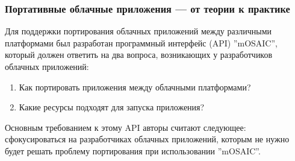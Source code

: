 \subsubsection{Портативные облачные приложения --- от теории к практике}
Для поддержки портирования облачных приложений между различными платформами был разработан программный интерфейс (API) ''mOSAIC''\cite{portable-cloud-applications}, который должен ответить на два вопроса, возникающих у разработчиков облачных приложений:
\begin{enumerate}
    \item Как портировать приложения между облачными платформами?
    \item Какие ресурсы подходят для запуска приложения?
\end{enumerate}
Основным требованием к этому API авторы считают следующее: сфокусироваться на разработчиках облачных приложений, которым не нужно будет решать проблему портирования при использовании ''mOSAIC''.

